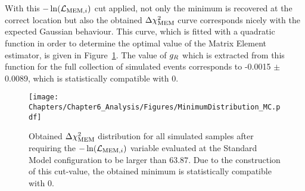 With this $-\ln(\mathcal{L}_{\textrm{MEM}, i})$ cut applied, not only the minimum is recovered at the correct location but also the obtained $\Delta \chi^{2}_{\textrm{MEM}}$ curve corresponds nicely with the expected Gaussian behaviour.
This curve, which is fitted with a quadratic function in order to determine the optimal value of the Matrix Element estimator, is given in Figure~\ref{fig::MinNominal}.
The value of $g_{R}$ which is extracted from this function for the full collection of simulated events corresponds to -0.0015 $\pm$ 0.0089, which is statistically compatible with $0$.
\\
\begin{figure}[h!t]
 \centering
 \texttt{[image: Chapters/Chapter6\_Analysis/Figures/MinimumDistribution\_MC.pdf]}
 \caption{Obtained $\Delta \chi^{2}_{\textrm{MEM}}$ distribution for all simulated samples after requiring the $-\ln(\mathcal{L}_{\textrm{MEM}, i})$ variable evaluated at the Standard Model configuration to be larger than $63.87$. Due to the construction of this cut-value, the obtained minimum is statistically compatible with $0$.} \label{fig::MinNominal}
\end{figure}



